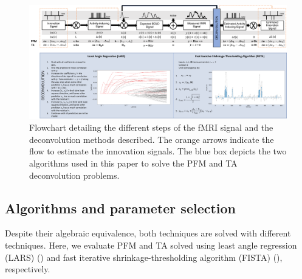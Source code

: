 \begin{figure}[H]
    \begin{center}
        \includegraphics[width=\columnwidth]{figures/flowchart.pdf}
    \end{center}
    \caption{Flowchart detailing the different steps of the fMRI signal and the deconvolution methods described. The orange arrows indicate the flow to estimate the innovation signals. The blue box depicts the two algorithms used in this paper to solve the PFM and TA deconvolution problems.}
\label{fig:flowchart}
\end{figure}

\subsection{Algorithms and parameter selection}
\label{sec:regparam}

Despite their algebraic equivalence, both techniques are solved with different techniques. Here, we evaluate PFM and TA solved using least angle regression (LARS) (\citealt{efron2004LeastAngleRegression}) and fast iterative shrinkage-thresholding algorithm (FISTA) (\citealt{beck2009FastIterativeShrinkagethresholding}), respectively.

